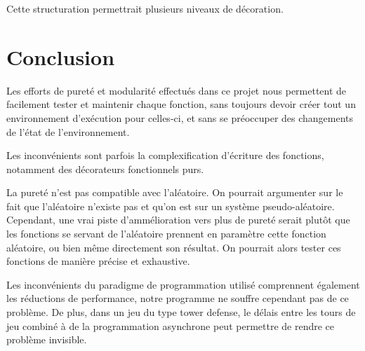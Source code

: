 \documentclass{article}
\begin{document}
Cette structuration permettrait plusieurs niveaux de décoration.

\section{Conclusion}

Les efforts de pureté et modularité effectués dans ce projet nous permettent de facilement tester et maintenir chaque fonction, sans toujours devoir créer tout un environnement d'exécution pour celles-ci, et sans se préoccuper des changements de l'état de l'environnement.

Les inconvénients sont parfois la complexification d'écriture des fonctions, notamment des décorateurs fonctionnels purs.

La pureté n'est pas compatible avec l'aléatoire. On pourrait argumenter sur le fait que l'aléatoire n'existe pas et qu'on est sur un système pseudo-aléatoire. Cependant, une vrai piste d'ammélioration vers plus de pureté serait plutôt que les fonctions se servant de l'aléatoire prennent en paramètre cette fonction aléatoire, ou bien même directement son résultat. On pourrait alors tester ces fonctions de manière précise et exhaustive.

Les inconvénients du paradigme de programmation utilisé comprennent également les réductions de performance, notre programme ne souffre cependant pas de ce problème. De plus, dans un jeu du type tower defense, le délais entre les tours de jeu combiné à de la programmation asynchrone peut permettre de rendre ce problème invisible.
\end{document}
